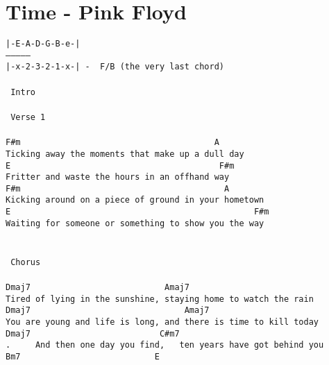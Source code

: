 \newpage
\section{Time - Pink Floyd}
\label{Time - Pink Floyd}
\texttt{|-E-A-D-G-B-e-|\\
---------------\\
|-x-2-3-2-1-x-|\ - \ F/B (the very last chord)\\
\\
\lbrack\ Intro\rbrack\\
\\
\lbrack\ Verse\ 1\rbrack\\
\\
F\#m\ \ \ \ \ \ \ \ \ \ \ \ \ \ \ \ \ \ \ \ \ \ \ \ \ \ \ \ \ \ \ \ \ \ \ \ \ \ \ A\\
Ticking\ away\ the\ moments\ that\ make\ up\ a\ dull\ day\\
E\ \ \ \ \ \ \ \ \ \ \ \ \ \ \ \ \ \ \ \ \ \ \ \ \ \ \ \ \ \ \ \ \ \ \ \ \ \ \ \ \ \ F\#m\\
Fritter\ and\ waste\ the\ hours\ in\ an\ offhand\ way\\
F\#m\ \ \ \ \ \ \ \ \ \ \ \ \ \ \ \ \ \ \ \ \ \ \ \ \ \ \ \ \ \ \ \ \ \ \ \ \ \ \ \ \ A\\
Kicking\ around\ on\ a\ piece\ of\ ground\ in\ your\ hometown\\
E\ \ \ \ \ \ \ \ \ \ \ \ \ \ \ \ \ \ \ \ \ \ \ \ \ \ \ \ \ \ \ \ \ \ \ \ \ \ \ \ \ \ \ \ \ \ \ \ \ F\#m\\
Waiting\ for\ someone\ or\ something\ to\ show\ you\ the\ way\\
\\
\\
\lbrack\ Chorus\rbrack\\
\\
Dmaj7\ \ \ \ \ \ \ \ \ \ \ \ \ \ \ \ \ \ \ \ \ \ \ \ \ \ \ Amaj7\\
Tired\ of\ lying\ in\ the\ sunshine,\ staying\ home\ to\ watch\ the\ rain\\
Dmaj7\ \ \ \ \ \ \ \ \ \ \ \ \ \ \ \ \ \ \ \ \ \ \ \ \ \ \ \ \ \ \ Amaj7\\
You\ are\ young\ and\ life\ is\ long,\ and\ there\ is\ time\ to\ kill\ today\\
Dmaj7\ \ \ \ \ \ \ \ \ \ \ \ \ \ \ \ \ \ \ \ \ \ \ \ \ \ C\#m7\\
.\ \ \ \ \ And\ then\ one\ day\ you\ find,\ \ \ ten\ years\ have\ got\ behind\ you\\
Bm7\ \ \ \ \ \ \ \ \ \ \ \ \ \ \ \ \ \ \ \ \ \ \ \ \ \ \ E\\
}
